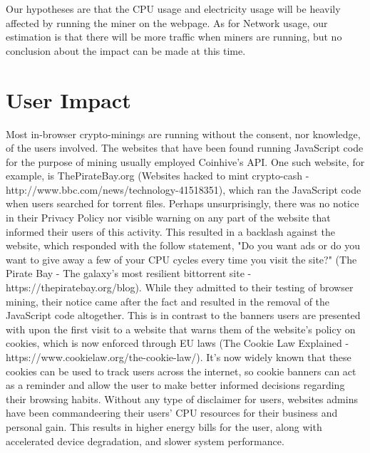 Our hypotheses are that the CPU usage and electricity usage will be heavily affected by running the miner on the webpage. As for Network usage, our estimation is that there will be more traffic when miners are running, but no conclusion about the impact can be made at this time.



\section{User Impact}

Most in-browser crypto-minings are running without the consent, nor knowledge, of the users involved. The websites that have been found running JavaScript code for the purpose of mining usually employed Coinhive's API. One such website, for example, is  ThePirateBay.org (Websites hacked to mint crypto-cash - http://www.bbc.com/news/technology-41518351), which ran the JavaScript code when users searched for torrent files. Perhaps unsurprisingly, there was no notice in their Privacy Policy nor visible warning on any part of the website that informed their users of this activity. This resulted in a backlash against the website, which responded with the follow statement, "Do you want ads or do you want to give away a few of your CPU cycles every time you visit the site?" (The Pirate Bay - The galaxy's most resilient bittorrent site - https://thepiratebay.org/blog). While they admitted to their testing of browser mining, their notice came after the fact and resulted in the removal of the JavaScript code altogether. This is in contrast to the banners users are presented with upon the first visit to a website that warns them of the website’s policy on cookies, which is now enforced through EU laws (The Cookie Law Explained - https://www.cookielaw.org/the-cookie-law/). It’s now widely known that these cookies can be used to track users across the internet, so cookie banners can act as a reminder and allow the user to make better informed decisions regarding their browsing habits. Without any type of disclaimer for users, websites admins have been commandeering their users’ CPU resources for their business and personal gain. This results in higher energy bills for the user, along with accelerated device degradation, and slower system performance.
\\
